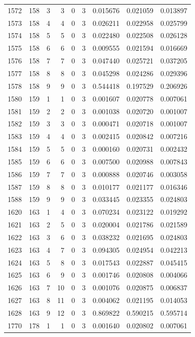 \begin{longtable}{rrrrrrrrr}
1572 & 158 & 3 & 3 & 0 & 3 & 0.015676 & 0.021059 & 0.013897 \\
1573 & 158 & 4 & 4 & 0 & 3 & 0.026211 & 0.022958 & 0.025799 \\
1574 & 158 & 5 & 5 & 0 & 3 & 0.022480 & 0.022508 & 0.026128 \\
1575 & 158 & 6 & 6 & 0 & 3 & 0.009555 & 0.021594 & 0.016669 \\
1576 & 158 & 7 & 7 & 0 & 3 & 0.047440 & 0.025721 & 0.037205 \\
1577 & 158 & 8 & 8 & 0 & 3 & 0.045298 & 0.024286 & 0.029396 \\
1578 & 158 & 9 & 9 & 0 & 3 & 0.544418 & 0.197529 & 0.206926 \\
1580 & 159 & 1 & 1 & 0 & 3 & 0.001607 & 0.020778 & 0.007061 \\
1581 & 159 & 2 & 2 & 0 & 3 & 0.001038 & 0.020720 & 0.001007 \\
1582 & 159 & 3 & 3 & 0 & 3 & 0.000471 & 0.020718 & 0.001007 \\
1583 & 159 & 4 & 4 & 0 & 3 & 0.002415 & 0.020842 & 0.007216 \\
1584 & 159 & 5 & 5 & 0 & 3 & 0.000160 & 0.020731 & 0.002432 \\
1585 & 159 & 6 & 6 & 0 & 3 & 0.007500 & 0.020988 & 0.007843 \\
1586 & 159 & 7 & 7 & 0 & 3 & 0.000888 & 0.020746 & 0.003058 \\
1587 & 159 & 8 & 8 & 0 & 3 & 0.010177 & 0.021177 & 0.016346 \\
1588 & 159 & 9 & 9 & 0 & 3 & 0.033445 & 0.023355 & 0.024803 \\
1620 & 163 & 1 & 4 & 0 & 3 & 0.070234 & 0.023122 & 0.019292 \\
1621 & 163 & 2 & 5 & 0 & 3 & 0.020004 & 0.021786 & 0.021589 \\
1622 & 163 & 3 & 6 & 0 & 3 & 0.038232 & 0.021695 & 0.024803 \\
1623 & 163 & 4 & 7 & 0 & 3 & 0.094305 & 0.024954 & 0.042213 \\
1624 & 163 & 5 & 8 & 0 & 3 & 0.017543 & 0.022887 & 0.045415 \\
1625 & 163 & 6 & 9 & 0 & 3 & 0.001746 & 0.020808 & 0.004066 \\
1626 & 163 & 7 & 10 & 0 & 3 & 0.001076 & 0.020875 & 0.006837 \\
1627 & 163 & 8 & 11 & 0 & 3 & 0.004062 & 0.021195 & 0.014053 \\
1628 & 163 & 9 & 12 & 0 & 3 & 0.869822 & 0.590215 & 0.595714 \\
1770 & 178 & 1 & 1 & 0 & 3 & 0.001640 & 0.020802 & 0.007061 \\

\end{longtable}
